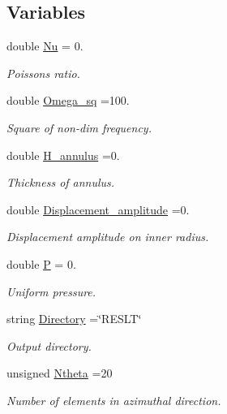 \subsection*{Variables}
\begin{DoxyCompactItemize}
\item 
double \hyperlink{namespaceGlobal__Parameters_a20fccdcfa2c15ad8b951b9ada3bb1661}{Nu} = 0.
\begin{DoxyCompactList}\small\item\em Poisson\textquotesingle{}s ratio. \end{DoxyCompactList}\item 
double \hyperlink{namespaceGlobal__Parameters_af9e1e178dfb7f5e35b452599bd4c4324}{Omega\+\_\+sq} =100.
\begin{DoxyCompactList}\small\item\em Square of non-\/dim frequency. \end{DoxyCompactList}\item 
double \hyperlink{namespaceGlobal__Parameters_a0b73c5ead1114ae88bbd4cb0eb54f078}{H\+\_\+annulus} =0.
\begin{DoxyCompactList}\small\item\em Thickness of annulus. \end{DoxyCompactList}\item 
double \hyperlink{namespaceGlobal__Parameters_a0138eb659958d7d7d1afd12577becf82}{Displacement\+\_\+amplitude} =0.
\begin{DoxyCompactList}\small\item\em Displacement amplitude on inner radius. \end{DoxyCompactList}\item 
double \hyperlink{namespaceGlobal__Parameters_a31fb55c20db4aa0127aafa20f0d76731}{P} = 0.
\begin{DoxyCompactList}\small\item\em Uniform pressure. \end{DoxyCompactList}\item 
string \hyperlink{namespaceGlobal__Parameters_a301ab922df72030c660b21328d6caf76}{Directory} =\char`\"{}R\+E\+S\+LT\char`\"{}
\begin{DoxyCompactList}\small\item\em Output directory. \end{DoxyCompactList}\item 
unsigned \hyperlink{namespaceGlobal__Parameters_a1f67286edeb13ef67687fd483e105b5e}{Ntheta} =20
\begin{DoxyCompactList}\small\item\em Number of elements in azimuthal direction. \end{DoxyCompactList}\item 

\end{DoxyCompactItemize}
